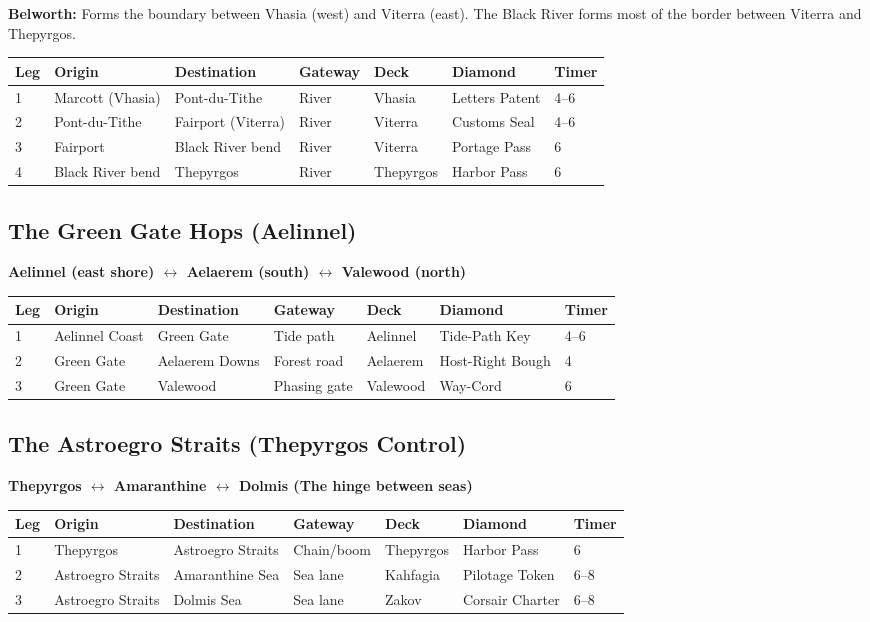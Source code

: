 \documentclass[12pt,oneside]{book}
\begin{document}
\textbf{Belworth:} Forms the boundary between Vhasia (west) and Viterra (east). The Black River forms most of the border between Viterra and Thepyrgos.

\begin{longtable}{|p{1.5cm}|p{2.5cm}|p{2.5cm}|p{1.5cm}|p{2cm}|p{1.5cm}|}
\hline
\textbf{Leg} & \textbf{Origin} & \textbf{Destination} & \textbf{Gateway} & \textbf{Deck} & \textbf{Diamond} & \textbf{Timer} \\
 & Marcott (Vhasia) & Pont-du-Tithe & River & Vhasia & Letters Patent & 4--6 \\
2 & Pont-du-Tithe & Fairport (Viterra) & River & Viterra & Customs Seal & 4--6 \\
3 & Fairport & Black River bend & River & Viterra & Portage Pass & 6 \\
4 & Black River bend & Thepyrgos & River & Thepyrgos & Harbor Pass & 6 \\
\hline
\end{longtable}

\subsection{The Green Gate Hops (Aelinnel)}

\textbf{Aelinnel (east shore) $\leftrightarrow$ Aelaerem (south) $\leftrightarrow$ Valewood (north)}

\begin{longtable}{|p{1.5cm}|p{2.5cm}|p{2.5cm}|p{1.5cm}|p{2cm}|p{1.5cm}|}
\hline
\textbf{Leg} & \textbf{Origin} & \textbf{Destination} & \textbf{Gateway} & \textbf{Deck} & \textbf{Diamond} & \textbf{Timer} \\
 & Aelinnel Coast & Green Gate & Tide path & Aelinnel & Tide-Path Key & 4--6 \\
2 & Green Gate & Aelaerem Downs & Forest road & Aelaerem & Host-Right Bough & 4 \\
3 & Green Gate & Valewood & Phasing gate & Valewood & Way-Cord & 6 \\
\hline
\end{longtable}

\subsection{The Astroegro Straits (Thepyrgos Control)}

\textbf{Thepyrgos $\leftrightarrow$ Amaranthine $\leftrightarrow$ Dolmis (The hinge between seas)}

\begin{longtable}{|p{1.5cm}|p{2.5cm}|p{2.5cm}|p{1.5cm}|p{2cm}|p{1.5cm}|}
\hline
\textbf{Leg} & \textbf{Origin} & \textbf{Destination} & \textbf{Gateway} & \textbf{Deck} & \textbf{Diamond} & \textbf{Timer} \\
 & Thepyrgos & Astroegro Straits & Chain/boom & Thepyrgos & Harbor Pass & 6 \\
2 & Astroegro Straits & Amaranthine Sea & Sea lane & Kahfagia & Pilotage Token & 6--8 \\
3 & Astroegro Straits & Dolmis Sea & Sea lane & Zakov & Corsair Charter & 6--8 \\
\hline
\end{longtable}
\end{document}
